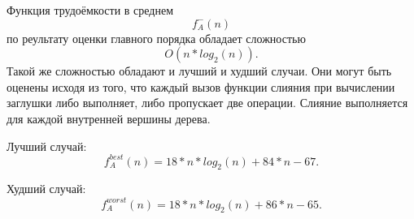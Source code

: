\documentclass[12pt,a4paper]{scrartcl}
\begin{document}
Функция трудоёмкости в среднем 
\begin{equation*}
f_A^-(n)
\end{equation*}
по реультату оценки главного порядка обладает сложностью 
\begin{equation}\label{eq2.21}
O(n*log_2(n)).
\end{equation}
Такой же сложностью обладают и лучший и худший случаи. Они могут быть оценены исходя из того, что каждый вызов функции слияния при вычислении заглушки либо выполняет, либо пропускает две операции. Слияние выполняется для каждой внутренней вершины дерева.

Лучший случай:
\begin{equation}\label{eq2.22}
f_A^{best}(n) =  18*n*log_2(n) + 84*n - 67.
\end{equation}

Худший случай:
\begin{equation}\label{eq2.22}
f_A^{worst}(n) =  18*n*log_2(n) + 86*n - 65.
\end{equation}
\end{document}
